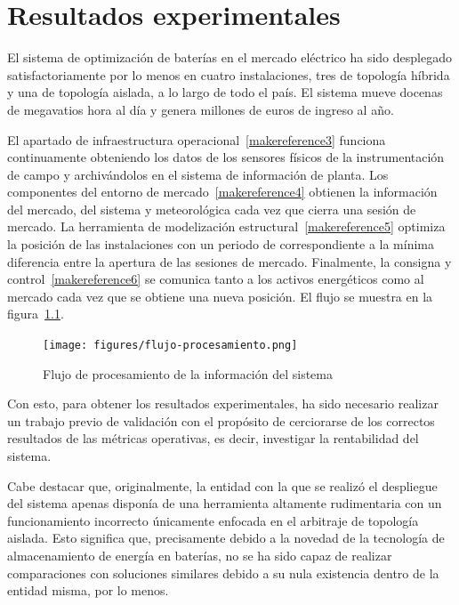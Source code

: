 \cleardoublepage

\chapter{Resultados experimentales}
\label{makereference7}

El sistema de optimización de baterías en el mercado eléctrico ha sido desplegado satisfactoriamente por lo menos en cuatro instalaciones, tres de topología híbrida y una de topología aislada, a lo largo de todo el país. El sistema mueve docenas de megavatios hora al día y genera millones de euros de ingreso al año.

El apartado de infraestructura operacional~\ref{makereference3} funciona continuamente obteniendo los datos de los sensores físicos de la instrumentación de campo y archivándolos en el sistema de información de planta. Los componentes del entorno de mercado~\ref{makereference4} obtienen la información del mercado, del sistema y meteorológica cada vez que cierra una sesión de mercado. La herramienta de modelización estructural~\ref{makereference5} optimiza la posición de las instalaciones con un periodo de correspondiente a la mínima diferencia entre la apertura de las sesiones de mercado. Finalmente, la consigna y control~\ref{makereference6} se comunica tanto a los activos energéticos como al mercado cada vez que se obtiene una nueva posición. El flujo se muestra en la figura~\ref{fig:flujo-procesamiento}.

\begin{figure}
\centering
\texttt{[image: figures/flujo-procesamiento.png]}
\caption{Flujo de procesamiento de la información del sistema}
\label{fig:flujo-procesamiento}
\end{figure}

Con esto, para obtener los resultados experimentales, ha sido necesario realizar un trabajo previo de validación con el propósito de cerciorarse de los correctos resultados de las métricas operativas, es decir, investigar la rentabilidad del sistema.

Cabe destacar que, originalmente, la entidad con la que se realizó el despliegue del sistema apenas disponía de una herramienta altamente rudimentaria con un funcionamiento incorrecto únicamente enfocada en el arbitraje de topología aislada. Esto significa que, precisamente debido a la novedad de la tecnología de almacenamiento de energía en baterías, no se ha sido capaz de realizar comparaciones con soluciones similares debido a su nula existencia dentro de la entidad misma, por lo menos.

